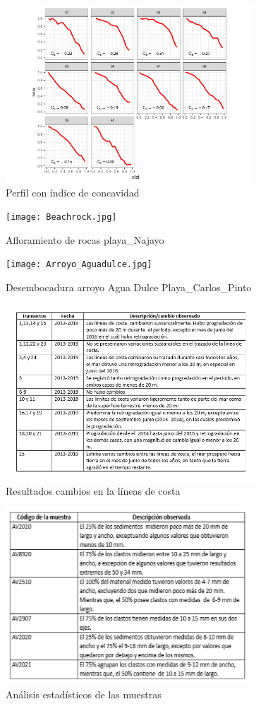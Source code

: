 \documentclass[11pt,]{article}
\begin{document}
\begin{figure}
\centering
\includegraphics[height=2.60417in]{indice_concavidad_31-40.png}
\caption{Perfil con índice de concavidad\label{indice}}
\end{figure}

\begin{figure}
\centering
\texttt{[image: Beachrock.jpg]}
\caption{Afloramiento de rocas playa\_Najayo\label{beachrock}}
\end{figure}

\begin{figure}
\centering
\texttt{[image: Arroyo\_Aguadulce.jpg]}
\caption{Desembocadura arroyo Agua Dulce
Playa\_Carlos\_Pinto\label{arroyo_aguadulce}}
\end{figure}

\begin{figure}
\centering
\includegraphics[height=2.60417in]{resultados_cambio_lineas.png}
\caption{Resultados cambios en la líneas de costa\label{resultados}}
\end{figure}

\begin{figure}
\centering
\includegraphics[height=2.60417in]{resultados_estadisticos.png}
\caption{Análisis estadísticos de las muestras\label{estadistico}}
\end{figure}
\end{document}
